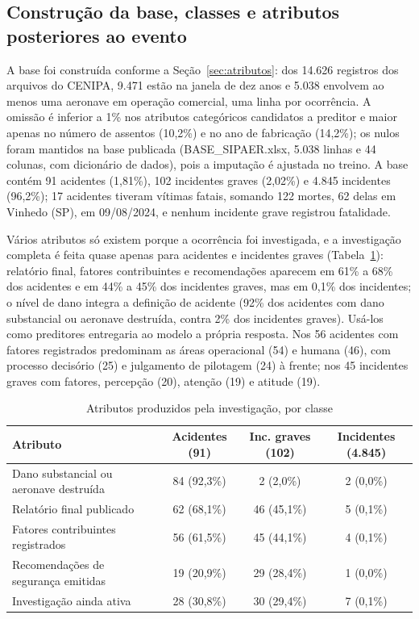 \documentclass[12pt]{article}
\begin{document}
\subsection{Construção da base, classes e atributos posteriores ao evento}
\label{sec:base}

A base foi construída conforme a Seção~\ref{sec:atributos}: dos 14.626 registros dos arquivos do CENIPA, 9.471 estão na janela de dez anos e 5.038 envolvem ao menos uma aeronave em operação comercial, uma linha por ocorrência. A omissão é inferior a 1\% nos atributos categóricos candidatos a preditor e maior apenas no número de assentos (10,2\%) e no ano de fabricação (14,2\%); os nulos foram mantidos na base publicada (BASE\_SIPAER.xlsx, 5.038 linhas e 44 colunas, com dicionário de dados), pois a imputação é ajustada no treino. A base contém 91 acidentes (1,81\%), 102 incidentes graves (2,02\%) e 4.845 incidentes (96,2\%); 17 acidentes tiveram vítimas fatais, somando 122 mortes, 62 delas em Vinhedo (SP), em 09/08/2024, e nenhum incidente grave registrou fatalidade.

Vários atributos só existem porque a ocorrência foi investigada, e a investigação completa é feita quase apenas para acidentes e incidentes graves (Tabela~\ref{tab:posevento}): relatório final, fatores contribuintes e recomendações aparecem em 61\% a 68\% dos acidentes e em 44\% a 45\% dos incidentes graves, mas em 0,1\% dos incidentes; o nível de dano integra a definição de acidente (92\% dos acidentes com dano substancial ou aeronave destruída, contra 2\% dos incidentes graves). Usá-los como preditores entregaria ao modelo a própria resposta. Nos 56 acidentes com fatores registrados predominam as áreas operacional (54) e humana (46), com processo decisório (25) e julgamento de pilotagem (24) à frente; nos 45 incidentes graves com fatores, percepção (20), atenção (19) e atitude (19).

\begin{table}[htbp]
    \centering
    \caption{Atributos produzidos pela investigação, por classe}
    \vspace{0.05cm}
    \footnotesize\setlength{\tabcolsep}{3.5pt}\renewcommand{\arraystretch}{0.88}
    \begin{tabular}{lccc}
\toprule
\textbf{Atributo} & \textbf{Acidentes (91)} & \textbf{Inc. graves (102)} & \textbf{Incidentes (4.845)} \\
\midrule
Dano substancial ou aeronave destruída & 84 (92,3\%) & 2 (2,0\%) & 2 (0,0\%) \\
Relatório final publicado & 62 (68,1\%) & 46 (45,1\%) & 5 (0,1\%) \\
Fatores contribuintes registrados & 56 (61,5\%) & 45 (44,1\%) & 4 (0,1\%) \\
Recomendações de segurança emitidas & 19 (20,9\%) & 29 (28,4\%) & 1 (0,0\%) \\
Investigação ainda ativa & 28 (30,8\%) & 30 (29,4\%) & 7 (0,1\%) \\
\bottomrule
\end{tabular}
    \label{tab:posevento}
\end{table}
\end{document}
